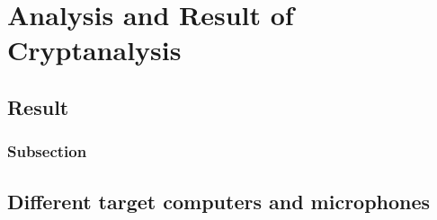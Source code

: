 \chapter{Analysis and Result of Cryptanalysis}
\label{chp:analysis_result} 

\section{Result}\label{sec:result}

\subsection{Subsection}\label{sec:first_ssection}


\section{Different target computers and microphones}\label{sec:different_target_computers}
